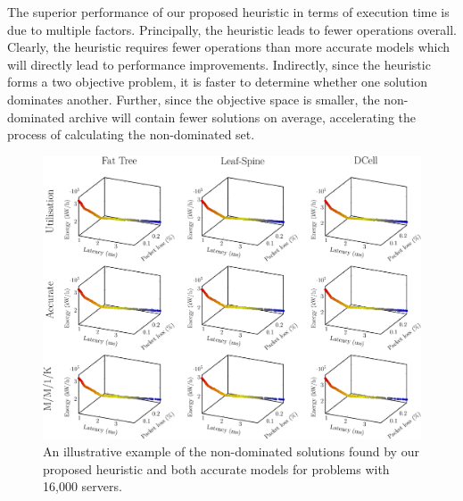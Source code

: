 The superior performance of our proposed heuristic in terms of execution time is due to multiple factors. Principally, the heuristic leads to fewer operations overall. Clearly, the heuristic requires fewer operations than more accurate models which will directly lead to performance improvements. Indirectly, since the heuristic forms a two objective problem, it is faster to determine whether one solution dominates another. Further, since the objective space is smaller, the non-dominated archive will contain fewer solutions on average, accelerating the process of calculating the non-dominated set.

\begin{figure}[t!]
    \includegraphics[width=\linewidth]{figures/graphs/models/pareto_fronts-crop}
    \caption{An illustrative example of the non-dominated solutions found by our proposed heuristic and both accurate models for problems with 16,000 servers.}
    \label{fig:models_pfs}
\end{figure}
